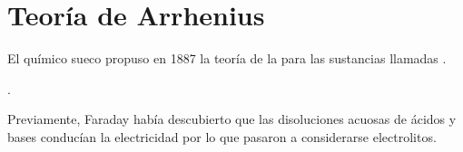 
%

    \section{Teoría de Arrhenius}
    El químico sueco  propuso en \num{1887} la teoría de la  para las sustancias llamadas .

    .

    Previamente, Faraday había descubierto que las disoluciones acuosas de ácidos y bases conducían la electricidad por lo que pasaron a considerarse electrolitos.

